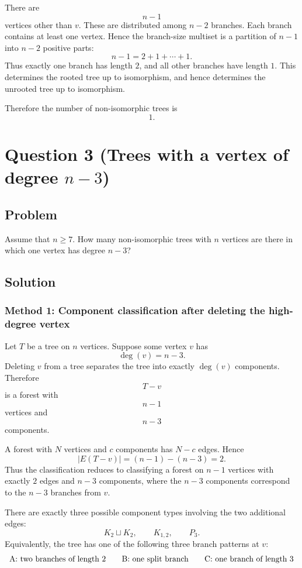 \documentclass[12pt]{article}
\begin{document}
There are
\[
  n-1
\]
vertices other than $v$. These are distributed among $n-2$ branches. Each branch contains at least one vertex. Hence the branch-size multiset is a partition of $n-1$ into $n-2$ positive parts:
\[
  n-1=2+1+\cdots+1.
\]
Thus exactly one branch has length $2$, and all other branches have length $1$. This determines the rooted tree up to isomorphism, and hence determines the unrooted tree up to isomorphism.

Therefore the number of non-isomorphic trees is
\[
  \boxed{1}.
\]

\newpage
\section{Question 3 (Trees with a vertex of degree $n-3$)}

\subsection{Problem}
Assume that $n\ge 7$. How many non-isomorphic trees with $n$ vertices are there in which one vertex has degree $n-3$?

\subsection{Solution}

\subsubsection{Method 1: Component classification after deleting the high-degree vertex}
Let $T$ be a tree on $n$ vertices. Suppose some vertex $v$ has
\[
  \deg(v)=n-3.
\]
Deleting $v$ from a tree separates the tree into exactly $\deg(v)$ components. Therefore
\[
  T-v
\]
is a forest with
\[
  n-1
\]
vertices and
\[
  n-3
\]
components.

A forest with $N$ vertices and $c$ components has $N-c$ edges. Hence
\[
  |E(T-v)|=(n-1)-(n-3)=2.
\]
Thus the classification reduces to classifying a forest on $n-1$ vertices with exactly $2$ edges and $n-3$ components, where the $n-3$ components correspond to the $n-3$ branches from $v$.

There are exactly three possible component types involving the two additional edges:
\[
  K_2\sqcup K_2,\qquad K_{1,2},\qquad P_3.
\]
Equivalently, the tree has one of the following three branch patterns at $v$:
\[
\begin{array}{c@{\qquad}c@{\qquad}c}
\text{A: two branches of length }2
&
\text{B: one split branch}
&
\text{C: one branch of length }3
\end{array}
\]
\end{document}
